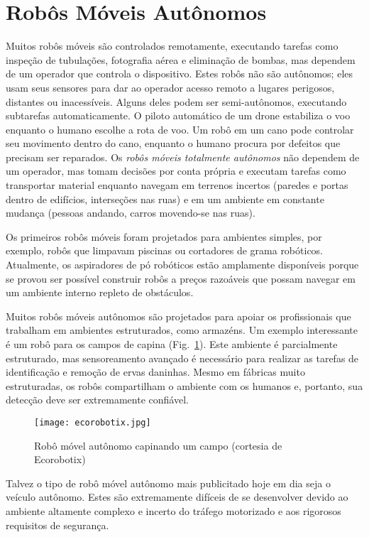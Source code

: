 \section{Robôs Móveis Autônomos}

Muitos robôs móveis são controlados remotamente, executando tarefas como inspeção de tubulações, fotografia aérea e eliminação de bombas, mas dependem de um operador que controla o dispositivo. Estes robôs não são autônomos; eles usam seus sensores para dar ao operador acesso remoto a lugares perigosos, distantes ou inacessíveis. Alguns deles podem ser semi-autônomos, executando subtarefas automaticamente. O piloto automático de um drone estabiliza o voo enquanto o humano escolhe a rota de voo. Um robô em um cano pode controlar seu movimento dentro do cano, enquanto o humano procura por defeitos que precisam ser reparados. Os \emph{robôs móveis totalmente autônomos} não dependem de um operador, mas tomam decisões por conta própria e executam tarefas como transportar material enquanto navegam em terrenos incertos (paredes e portas dentro de edifícios, interseções nas ruas) e em um ambiente em constante mudança (pessoas andando, carros movendo-se nas ruas).

Os primeiros robôs móveis foram projetados para ambientes simples, por exemplo, robôs que limpavam piscinas ou cortadores de grama robóticos. Atualmente, os aspiradores de pó robóticos estão amplamente disponíveis porque se provou ser possível construir robôs a preços razoáveis que possam navegar em um ambiente interno repleto de obstáculos.

Muitos robôs móveis autônomos são projetados para apoiar os profissionais que trabalham em ambientes estruturados, como armazéns. Um exemplo interessante é um robô para os campos de capina (Fig.~\ref{fig.agri_robot}). Este ambiente é parcialmente estruturado, mas sensoreamento avançado é necessário para realizar as tarefas de identificação e remoção de ervas daninhas. Mesmo em fábricas muito estruturadas, os robôs compartilham o ambiente com os humanos e, portanto, sua detecção deve ser extremamente confiável.

\begin{figure}
\begin{center}
\texttt{[image: ecorobotix.jpg]}
\end{center}
\caption{Robô móvel autônomo capinando um campo (cortesia de Ecorobotix)}\label{fig.agri_robot}
\end{figure}

Talvez o tipo de robô móvel autônomo mais publicitado hoje em dia seja o veículo autônomo. Estes são extremamente difíceis de se desenvolver devido ao ambiente altamente complexo e incerto do tráfego motorizado e aos rigorosos requisitos de segurança.

